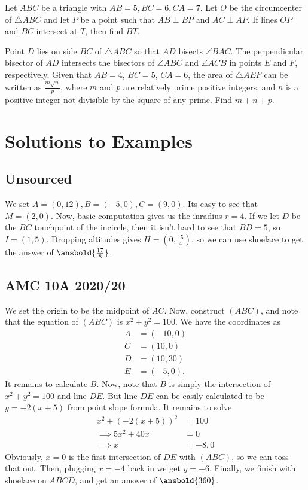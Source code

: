 \documentclass{article}
\begin{document}
\begin{prob}[CIME II 2021/12]{9}
Let $ABC$ be a triangle with $AB = 5, BC = 6, CA = 7$. Let $O$ be the circumcenter of $\triangle ABC$ and let $P$ be a point such that $AB \perp BP$ and $AC \perp AP$. If lines $OP$ and $BC$ intersect at $T$, then find $BT$.
\end{prob}

\begin{prob}[AIME I 2020/13]{9}
Point $D$ lies on side $BC$ of $\triangle ABC$ so that $\overline{AD}$ bisects $\angle BAC$. The perpendicular bisector of $\overline{AD}$ intersects the bisectors of $\angle ABC$ and $\angle ACB$ in points $E$ and $F$, respectively. Given that $AB=4$, $BC=5$, $CA=6$, the area of $\triangle AEF$ can be written as $\tfrac{m\sqrt n}p$, where $m$ and $p$ are relatively prime positive integers, and $n$ is a positive integer not divisible by the square of any prime. Find $m+n+p$.
\end{prob}

\pagebreak

\appendix

\section{Solutions to Examples}
\subsection{Unsourced}
We set $A=(0,12),B=(-5,0),C=(9,0)$. Its easy to see that $M=(2,0)$. Now, basic computation gives us the inradius $r=4$. If we let $D$ be the $BC$ touchpoint of the incircle, then it isn't hard to see that $BD=5$, so $I=(1,5)$. Dropping altitudes gives $H=(0,\frac{15}{4})$, so we can use shoelace to get the answer of $\ansbold{\frac{17}{8}}$.

\subsection{AMC 10A 2020/20}

We set the origin to be the midpoint of $AC$. Now, construct $(ABC)$, and note that the equation of $(ABC)$ is $x^2+y^2=100$. We have the coordinates as
\begin{align*}
    A&=(-10,0)\\
    C&=(10,0)\\
    D&=(10,30)\\
    E&=(-5,0).
\end{align*}
It remains to calculate $B$. Now, note that $B$ is simply the intersection of $x^2+y^2=100$ and line $DE$. But line $DE$ can be easily calculated to be $y=-2(x+5)$ from point slope formula. It remains to solve 
\begin{align*}
    x^2+(-2(x+5))^2&=100\\
    \implies 5x^2+40x&=0\\
    \implies x&=-8,0
\end{align*}
Obviously, $x=0$ is the first intersection of $DE$ with $(ABC)$, so we can toss that out. Then, plugging $x=-4$ back in we get $y=-6$. Finally, we finish with shoelace on $ABCD$, and get an answer of $\ansbold{360}$.
\end{document}
